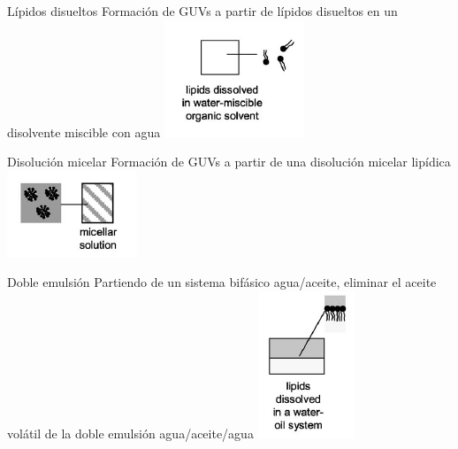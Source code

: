 \documentclass[spanish]{beamer}
\begin{document}
\begin{frame}{Lípidos disueltos}
  Formación de GUVs a partir de lípidos disueltos en un disolvente miscible con agua
  \vfill
  \centering
  \includegraphics[scale=0.8]{img/m_lipids}
\end{frame}

\begin{frame}{Disolución micelar}
  Formación de GUVs a partir de una disolución micelar lipídica
  \vfill
  \centering
  \includegraphics[scale=0.8]{img/m_micellar}
\end{frame}

\begin{frame}{Doble emulsión}
  Partiendo de un sistema bifásico agua/aceite, eliminar el aceite volátil de la doble emulsión agua/aceite/agua
  \vfill
  \centering
  \includegraphics[scale=0.8]{img/m_lipidswo}
\end{frame}
\end{document}

